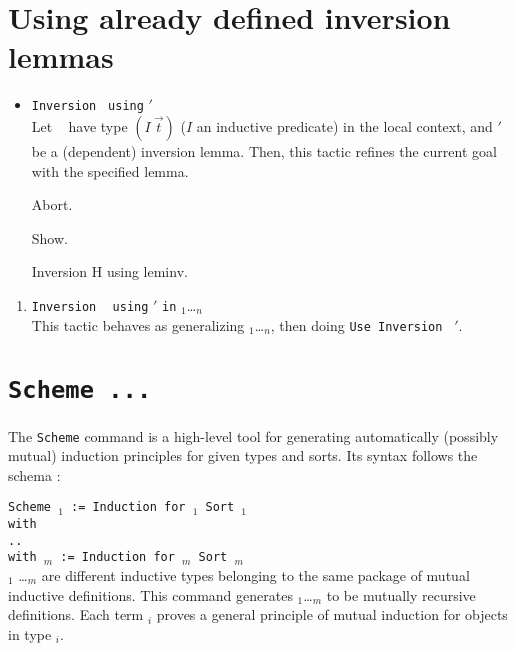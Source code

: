 \section{Using already defined inversion  lemmas}
\label{inversion_using}
\begin{itemize}
\item \texttt{Inversion} \ident \texttt{ using} \ident$'$ \\
  Let \ident~ have type $(I~\vec{t})$ ($I$ an inductive
  predicate) in the local context, and \ident$'$ be a (dependent) inversion
  lemma. Then, this tactic refines the current goal with the specified
  lemma. 


\begin{coq_eval}
Abort.
\end{coq_eval}

\begin{coq_example}
Show.
\end{coq_example}
\begin{coq_example}
Inversion H using leminv.
\end{coq_example}


\end{itemize}
\variant
\begin{enumerate}
\item \texttt{Inversion} \ident~ \texttt{using} \ident$'$ \texttt{in} \ident$_1$\ldots \ident$_n$\\
This tactic behaves as generalizing  \ident$_1$\ldots \ident$_n$,
then doing \texttt{Use Inversion} \ident~\ident$'$.
\end{enumerate}

\section{\tt Scheme ...}\label{Scheme}
\label{scheme}
The {\tt Scheme} command is a high-level tool for generating
automatically (possibly mutual) induction principles for given types
and sorts.  Its syntax follows the schema :

\noindent
{\tt Scheme {\ident$_1$} := Induction for \term$_1$ Sort {\sort$_1$} \\
  with\\
  \mbox{}\hspace{0.1cm} .. \\
        with {\ident$_m$} := Induction for {\term$_m$} Sort
        {\sort$_m$}}\\
\term$_1$ \ldots \term$_m$ are different inductive types belonging to
the same package of mutual inductive definitions. This command
generates {\ident$_1$}\ldots{\ident$_m$} to be mutually recursive
definitions. Each term {\ident$_i$} proves a general principle 
of mutual induction for objects in type {\term$_i$}. 


